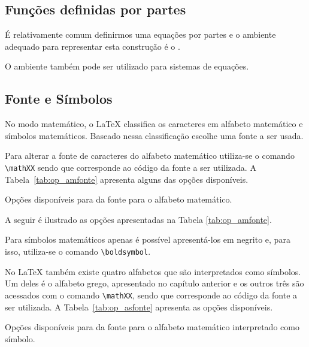 \subsection{Funções definidas por partes}
É relativamente comum definirmos uma equações por partes e o ambiente adequado
para representar esta construção é o . \\

O ambiente  também pode ser utilizado para sistemas de
equações.

\subsection{Fonte e Símbolos}
No modo matemático, o LaTeX classifica os caracteres em alfabeto matemático e
símbolos matemáticos. Baseado nessa classificação escolhe uma fonte a ser usada.

Para alterar a fonte de caracteres do alfabeto matemático utiliza-se o comando
\lstinline!\mathXX! sendo que  corresponde ao código da fonte a ser
utilizada. A Tabela~\ref{tab:op_amfonte} apresenta alguns das opções
disponíveis.
\begin{table}[h!tb]
  \centering
  \caption{Opções disponíveis para  da fonte para o alfabeto matemático.}
  \label{tab:op_amfonte}
  
\end{table}

A seguir é ilustrado as opções apresentadas na Tabela \ref{tab:op_amfonte}. \\

Para símbolos matemáticos apenas é possível apresentá-los em negrito e, para
isso, utiliza-se o comando \lstinline!\boldsymbol!. \\

No LaTeX também existe quatro alfabetos que são interpretados como símbolos. Um
deles é o alfabeto grego, apresentado no capítulo anterior e os outros três são
acessados com o comando \lstinline!\mathXX!, sendo que  corresponde ao
código da fonte a ser utilizada. A Tabela~\ref{tab:op_asfonte} apresenta as
opções disponíveis.
\begin{table}[h!tb]
  \centering
  \caption{Opções disponíveis para  da fonte para o alfabeto matemático interpretado como símbolo.}
  \label{tab:op_asfonte}
  
\end{table}

